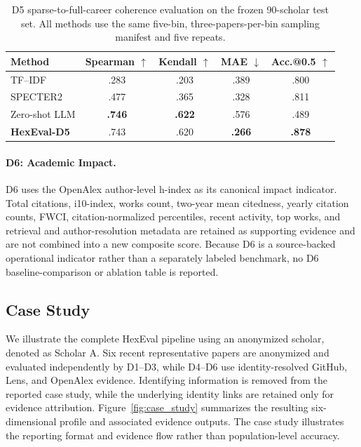 \documentclass[letterpaper]{article} %
\begin{document}
\begin{table}[t]
\centering
{\small
\setlength{\tabcolsep}{1mm}
\begin{tabular}{@{}lcccc@{}}
\toprule
\textbf{Method}
& \textbf{Spearman} $\uparrow$
& \textbf{Kendall} $\uparrow$
& \textbf{MAE} $\downarrow$
& \textbf{Acc.@0.5} $\uparrow$ \\
\midrule
TF--IDF
& .283 & .203 & .389 & .800 \\
SPECTER2
& .477 & .365 & .328 & .811 \\
Zero-shot LLM
& \textbf{.746} & \textbf{.622} & .576 & .489 \\
\textbf{HexEval-D5}
& .743 & .620 & \textbf{.266} & \textbf{.878} \\
\bottomrule
\end{tabular}
}
\caption{D5 sparse-to-full-career coherence evaluation on the frozen 90-scholar test set. All methods use the same five-bin, three-papers-per-bin sampling manifest and five repeats.}
\label{tab:d5_reference_comparison}
\end{table}

\paragraph{D6: Academic Impact.}
D6 uses the OpenAlex author-level h-index as its canonical impact indicator.
Total citations, i10-index, works count, two-year mean citedness, yearly citation
counts, FWCI, citation-normalized percentiles, recent activity, top works, and
retrieval and author-resolution metadata are retained as supporting evidence and
are not combined into a new composite score. Because D6 is a source-backed
operational indicator rather than a separately labeled benchmark, no D6
baseline-comparison or ablation table is reported.

\subsection{Case Study}

We illustrate the complete HexEval pipeline using an anonymized scholar, denoted as Scholar A. Six recent representative papers are anonymized and evaluated independently by D1--D3, while D4--D6 use identity-resolved
GitHub, Lens, and OpenAlex evidence. Identifying information is removed from the reported case study, while the underlying identity links are retained only for evidence attribution. Figure~\ref{fig:case_study} summarizes the
resulting six-dimensional profile and associated evidence outputs. The case study illustrates the reporting format and evidence flow rather than population-level accuracy.
\end{document}
